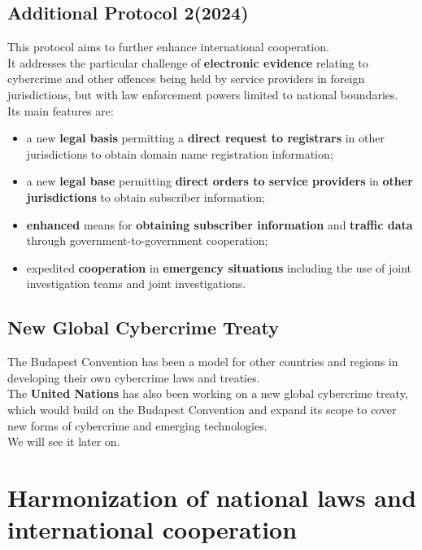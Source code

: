 \subsection{Additional Protocol 2(2024)}
This protocol aims to further enhance international cooperation.\\
It addresses the particular challenge of \textbf{electronic evidence}
relating to cybercrime and other offences being held by service
providers in foreign jurisdictions, but with law enforcement powers
limited to national boundaries.\\
Its main features are:
\begin{itemize}
  \item a new \textbf{legal basis} permitting a \textbf{direct request
    to registrars} in other jurisdictions to obtain domain name
    registration information;
  \item a new \textbf{legal base} permitting \textbf{direct orders to
    service providers} in \textbf{other jurisdictions} to obtain
    subscriber information;
  \item \textbf{enhanced} means for \textbf{obtaining subscriber
    information} and \textbf{traffic data} through
    government-to-government cooperation;
  \item expedited \textbf{cooperation} in \textbf{emergency
    situations} including the use of joint investigation teams and
    joint investigations.
\end{itemize}

\subsection{New Global Cybercrime Treaty}
The Budapest Convention has been a model for other countries and 
regions in developing their own cybercrime laws and treaties.\\ 
The \textbf{United Nations} has also been working on a new global 
cybercrime treaty, which would build on the Budapest Convention and 
expand its scope to cover new forms of cybercrime and emerging 
technologies.\\
We will see it later on.

\section{Harmonization of national laws and international cooperation}
